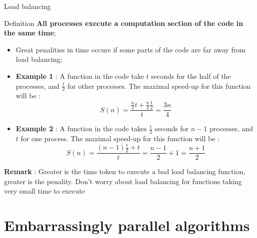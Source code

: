 \documentclass[compress,10pt,aspectratio=169]{beamer}
\begin{document}
\begin{frame}[fragile]{Load balancing}
    \scriptsize
    \begin{block}{Definition}
        \textbf{All processes execute a computation section of the code in the same time};
    \end{block}

    \begin{itemize}
        \item Great penalities in time occure if some parts of the code are far away from load balancing;
        \item \textbf{Example 1} : A function in the code take $t$ seconds for the half of the processes, and $\frac{t}{2}$
              for other processes. The maximal speed-up for this function will be :
            \[
                S(n) = \frac{\frac{n}{2}t + \frac{n}{2}\frac{t}{2}}{t} = \frac{3n}{4}
            \]
        \item \textbf{Example 2} : A function in the code takes $\frac{t}{2}$ seconds for $n-1$ processes, and $t$
            for one process. The maximal speed-up for this function will be :
          \[
              S(n) = \frac{(n-1)\frac{t}{2} + t}{t} = \frac{n-1}{2} + 1 = \frac{n+1}{2}
          \]
  \end{itemize}

  \textbf{Remark} : Greater is the time token to execute a  bad load balancing function, greater is the penality. Don't worry
  about load balancing for functions taking very small time to execute
\end{frame}

\section{Embarrassingly parallel algorithms}
\end{document}
